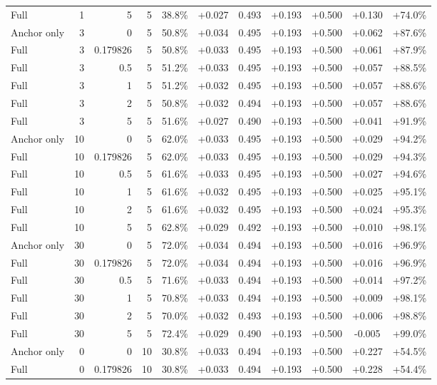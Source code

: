 \begin{table}[htbp]
\begin{tabular}{lrrrccccccc}
Full & 1 & 5 & 5 & 38.8\% & +0.027 & 0.493 & +0.193 & +0.500 & +0.130 & +74.0\% \\
Anchor only & 3 & 0 & 5 & 50.8\% & +0.034 & 0.495 & +0.193 & +0.500 & +0.062 & +87.6\% \\
Full & 3 & 0.179826 & 5 & 50.8\% & +0.033 & 0.495 & +0.193 & +0.500 & +0.061 & +87.9\% \\
Full & 3 & 0.5 & 5 & 51.2\% & +0.033 & 0.495 & +0.193 & +0.500 & +0.057 & +88.5\% \\
Full & 3 & 1 & 5 & 51.2\% & +0.032 & 0.495 & +0.193 & +0.500 & +0.057 & +88.6\% \\
Full & 3 & 2 & 5 & 50.8\% & +0.032 & 0.494 & +0.193 & +0.500 & +0.057 & +88.6\% \\
Full & 3 & 5 & 5 & 51.6\% & +0.027 & 0.490 & +0.193 & +0.500 & +0.041 & +91.9\% \\
Anchor only & 10 & 0 & 5 & 62.0\% & +0.033 & 0.495 & +0.193 & +0.500 & +0.029 & +94.2\% \\
Full & 10 & 0.179826 & 5 & 62.0\% & +0.033 & 0.495 & +0.193 & +0.500 & +0.029 & +94.3\% \\
Full & 10 & 0.5 & 5 & 61.6\% & +0.033 & 0.495 & +0.193 & +0.500 & +0.027 & +94.6\% \\
Full & 10 & 1 & 5 & 61.6\% & +0.032 & 0.495 & +0.193 & +0.500 & +0.025 & +95.1\% \\
Full & 10 & 2 & 5 & 61.6\% & +0.032 & 0.495 & +0.193 & +0.500 & +0.024 & +95.3\% \\
Full & 10 & 5 & 5 & 62.8\% & +0.029 & 0.492 & +0.193 & +0.500 & +0.010 & +98.1\% \\
Anchor only & 30 & 0 & 5 & 72.0\% & +0.034 & 0.494 & +0.193 & +0.500 & +0.016 & +96.9\% \\
Full & 30 & 0.179826 & 5 & 72.0\% & +0.034 & 0.494 & +0.193 & +0.500 & +0.016 & +96.9\% \\
Full & 30 & 0.5 & 5 & 71.6\% & +0.033 & 0.494 & +0.193 & +0.500 & +0.014 & +97.2\% \\
Full & 30 & 1 & 5 & 70.8\% & +0.033 & 0.494 & +0.193 & +0.500 & +0.009 & +98.1\% \\
Full & 30 & 2 & 5 & 70.0\% & +0.032 & 0.493 & +0.193 & +0.500 & +0.006 & +98.8\% \\
Full & 30 & 5 & 5 & 72.4\% & +0.029 & 0.490 & +0.193 & +0.500 & -0.005 & +99.0\% \\
Anchor only & 0 & 0 & 10 & 30.8\% & +0.033 & 0.494 & +0.193 & +0.500 & +0.227 & +54.5\% \\
Full & 0 & 0.179826 & 10 & 30.8\% & +0.033 & 0.494 & +0.193 & +0.500 & +0.228 & +54.4\% \\

\end{tabular}
\end{table}
